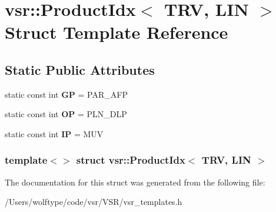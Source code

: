 \hypertarget{structvsr_1_1_product_idx_3_01_t_r_v_00_01_l_i_n_01_4}{\section{vsr\-:\-:Product\-Idx$<$ T\-R\-V, L\-I\-N $>$ Struct Template Reference}
\label{structvsr_1_1_product_idx_3_01_t_r_v_00_01_l_i_n_01_4}
}
\subsection*{Static Public Attributes}
\begin{DoxyCompactItemize}
\item 
\hypertarget{structvsr_1_1_product_idx_3_01_t_r_v_00_01_l_i_n_01_4_a99ff39b0507c3f5a054f942a5887e4b9}{static const int {\bfseries G\-P} = P\-A\-R\-\_\-\-A\-F\-P}\label{structvsr_1_1_product_idx_3_01_t_r_v_00_01_l_i_n_01_4_a99ff39b0507c3f5a054f942a5887e4b9}

\item 
\hypertarget{structvsr_1_1_product_idx_3_01_t_r_v_00_01_l_i_n_01_4_a512b1fb30f950e2b9b0ce7e645fa8a7e}{static const int {\bfseries O\-P} = P\-L\-N\-\_\-\-D\-L\-P}\label{structvsr_1_1_product_idx_3_01_t_r_v_00_01_l_i_n_01_4_a512b1fb30f950e2b9b0ce7e645fa8a7e}

\item 
\hypertarget{structvsr_1_1_product_idx_3_01_t_r_v_00_01_l_i_n_01_4_aa897bcbabc8a75530011e5b5afc51927}{static const int {\bfseries I\-P} = M\-U\-V}\label{structvsr_1_1_product_idx_3_01_t_r_v_00_01_l_i_n_01_4_aa897bcbabc8a75530011e5b5afc51927}

\end{DoxyCompactItemize}
\subsubsection*{template$<$$>$ struct vsr\-::\-Product\-Idx$<$ T\-R\-V, L\-I\-N $>$}



The documentation for this struct was generated from the following file\-:\begin{DoxyCompactItemize}
\item 
/\-Users/wolftype/code/vsr/\-V\-S\-R/vsr\-\_\-templates.\-h\end{DoxyCompactItemize}
